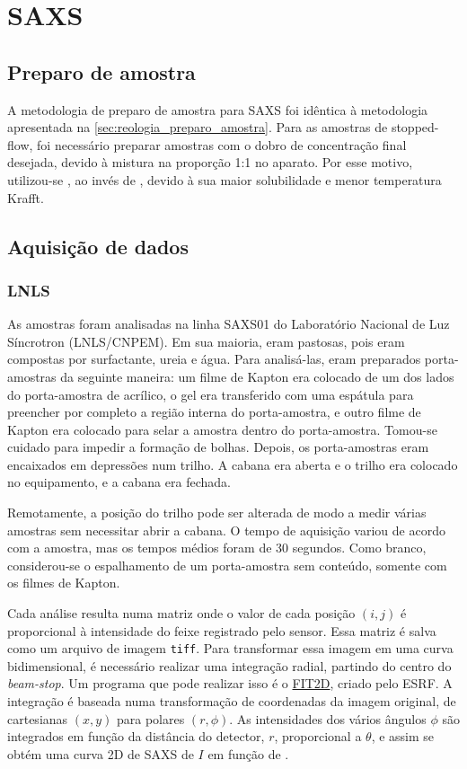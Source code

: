	\chapter{SAXS} 
		\section{Preparo de amostra}
		
		A metodologia de preparo de amostra para SAXS foi idêntica à metodologia apresentada na \autoref{sec:reologia_preparo_amostra}. Para as amostras de stopped-flow, foi necessário preparar amostras com o dobro de concentração final desejada, devido à mistura na proporção 1:1 no aparato. Por esse motivo, utilizou-se \TTAB, ao invés de \CTAB, devido à sua maior solubilidade e menor temperatura Krafft.
		
		\section{Aquisição de dados}
			\subsection{LNLS} 
			
			As amostras foram analisadas na linha SAXS01 do Laboratório Nacional de Luz Síncrotron (LNLS/CNPEM). Em sua maioria, eram pastosas, pois eram compostas por surfactante, ureia e água. Para analisá-las, eram preparados porta-amostras da seguinte maneira: um filme de Kapton era colocado de um dos lados do porta-amostra de acrílico, o gel era transferido com uma espátula para preencher por completo a região interna do porta-amostra, e outro filme de Kapton era colocado para selar a amostra dentro do porta-amostra. Tomou-se cuidado para impedir a formação de bolhas. Depois, os porta-amostras eram encaixados em depressões num trilho. A cabana era aberta e o trilho era colocado no equipamento, e a cabana era fechada.
					
			Remotamente, a posição do trilho pode ser alterada de modo a medir várias amostras sem necessitar abrir a cabana. O tempo de aquisição variou de acordo com a amostra, mas os tempos médios foram de 30 segundos. Como branco, considerou-se o espalhamento de um porta-amostra sem conteúdo, somente com os filmes de Kapton.
			
			Cada análise resulta numa matriz onde o valor de cada posição \((i, j)\) é proporcional à intensidade do feixe registrado pelo sensor. Essa matriz é salva como um arquivo de imagem \texttt{tiff}. Para transformar essa imagem em uma curva bidimensional, é necessário realizar uma integração radial, partindo do centro do \emph{beam-stop}. Um programa que pode realizar isso é o \href{http://www.esrf.eu/computing/scientific/FIT2D/windows.html}{FIT2D}, criado pelo ESRF. A integração é baseada numa transformação de coordenadas da imagem original, de cartesianas \((x, y)\) para polares \((r, \phi)\). As intensidades dos vários ângulos \(\phi\) são integrados em função da distância do detector, \(r\), proporcional a \(\theta\), e assim se obtém uma curva 2D de SAXS de \(I\) em função de \q. 
			
